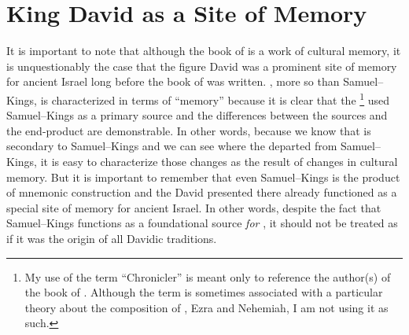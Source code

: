 
\section{King David as a Site of Memory}

It is important to note that although the book of \chronicles is a work of cultural memory, it is unquestionably the case that the figure David was a prominent site of memory for ancient Israel long before the book of \chronicles was written. \chronicles, more so than Samuel--Kings, is characterized in terms of ``memory'' because it is clear that the \chronicler%
    \footnote{My use of the term ``Chronicler'' is meant only to reference the author(s) of the book of \chronicles. Although the term is sometimes associated with a particular theory about the composition of \chronicles, Ezra and Nehemiah, I am not using it as such.}
used Samuel--Kings as a primary source and the differences between the sources and the end-product are demonstrable. In other words, because we know that \chronicles is secondary to Samuel--Kings and we can see where the \chronicler departed from Samuel--Kings, it is easy to characterize those changes as the result of changes in cultural memory. But it is important to remember that even Samuel--Kings is the product of mnemonic construction and the David presented there already functioned as a special site of memory for ancient Israel. In other words, despite the fact that Samuel--Kings functions as a foundational source \emph{for \chronicles}, it should not be treated as if it was the origin of all Davidic traditions.\autocite{frohlich_frohlich2019}


